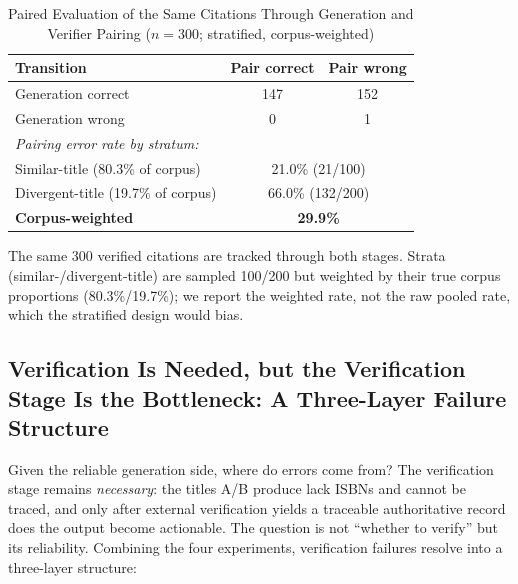 \documentclass[conference]{IEEEtran}
\begin{document}
\begin{table}[t]
\caption{Paired Evaluation of the Same Citations Through Generation and Verifier
Pairing ($n=300$; stratified, corpus-weighted)}
\label{tab:paired}
\centering
\small
\setlength{\tabcolsep}{4pt}
\begin{tabular}{lcc}
\toprule
Transition & Pair correct & Pair wrong \\
\midrule
Generation correct & 147 & 152 \\
Generation wrong    & 0   & 1   \\
\midrule
\multicolumn{3}{l}{\textit{Pairing error rate by stratum:}} \\
\quad Similar-title (80.3\% of corpus)   & \multicolumn{2}{c}{21.0\% (21/100)} \\
\quad Divergent-title (19.7\% of corpus) & \multicolumn{2}{c}{66.0\% (132/200)} \\
\quad \textbf{Corpus-weighted}           & \multicolumn{2}{c}{\textbf{29.9\%}} \\
\bottomrule
\end{tabular}

\vspace{2pt}
{\scriptsize The same 300 verified citations are tracked through both stages.
Strata (similar-/divergent-title) are sampled 100/200 but weighted by their true
corpus proportions (80.3\%/19.7\%); we report the weighted rate, not the raw
pooled rate, which the stratified design would bias.}
\end{table}

\subsection{Verification Is Needed, but the Verification Stage Is the
Bottleneck: A Three-Layer Failure Structure}
Given the reliable generation side, where do errors come from? The verification
stage remains \textit{necessary}: the titles A/B produce lack ISBNs and cannot
be traced, and only after external verification yields a traceable authoritative
record does the output become actionable. The question is not ``whether to
verify'' but its reliability. Combining the four experiments, verification
failures resolve into a three-layer structure:
\end{document}
